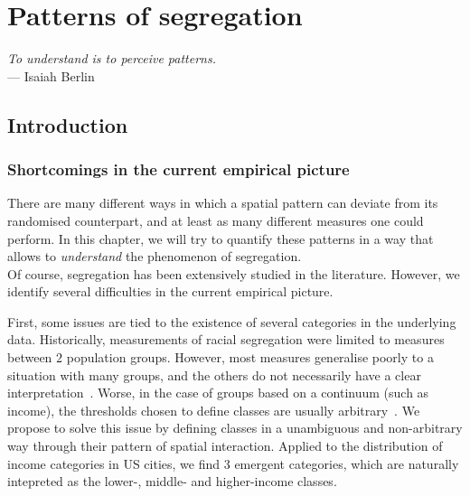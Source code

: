 %
\chapter{Patterns of segregation}
\label{chap:patterns_segregation}

\begin{flushright}{\slshape    
To understand is to perceive patterns.} \\ \medskip
--- Isaiah Berlin~\cite{Berlin:2013}
\end{flushright}


\bigskip


\section{Introduction}
\label{sec:introduction}

\subsection{Shortcomings in the current empirical picture}
\label{sub:shortcomings_in_the_current_empirical_picture}

There are many different ways in which a spatial pattern can deviate from its
randomised counterpart, and at least as many different measures one could
perform. In this chapter, we will try to quantify these patterns in a way that
allows to \emph{understand} the phenomenon of segregation.\\

Of course, segregation has been extensively studied in the literature. However,
we identify several difficulties in the current empirical picture.

First, some issues are tied to the existence of several categories in the
underlying data. Historically, measurements of racial segregation were limited
to measures between $2$ population groups. However, most measures generalise
poorly to a situation with many groups, and the others do not necessarily have a
clear interpretation~\cite{Reardon:2002}. Worse, in the case of groups based on
a continuum (such as income), the thresholds chosen to define classes are
usually arbitrary~\cite{Jargowsky:1996}. We propose to solve this issue by
defining classes in a unambiguous and non-arbitrary way through their pattern of
spatial interaction. Applied to the distribution of income categories in US
cities, we find $3$ emergent categories, which are naturally intepreted as the
lower-, middle- and higher-income classes.

